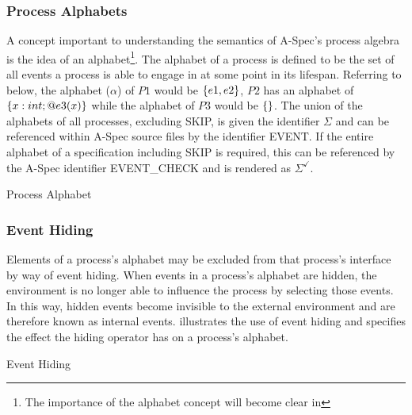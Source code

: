 \documentclass[letterpaper,10pt,draft]{book}
\begin{document}
\subsubsection{Process Alphabets}
   \label{sect:ProcAlpha}

A concept important to understanding the semantics of A-Spec's process algebra is
the idea of an alphabet\footnote{The importance of the alphabet concept will become
clear in }.  The alphabet of a process is defined to be the
set of all events a process is able to engage in at some point in its lifespan.
Referring to  below, the alphabet ($\alpha$) of $P1$ would be
$\{ e1, e2 \}$, $P2$ has an alphabet of $\{ x: int; @ e3(x) \}$ while the alphabet
of $P3$ would be $\{  \}$.  The union of the alphabets of all processes, excluding
SKIP, is given the identifier $\Sigma$ and can be referenced within A-Spec source
files by the identifier EVENT.  If the entire alphabet of a specification including
SKIP is required, this can be referenced by the A-Spec identifier EVENT\_CHECK and
is rendered as $\Sigma^{\checkmark}$.

\begin{example}
\begin{minipage}[t]{0.49\linewidth}
   
\end{minipage}
\begin{minipage}[t]{0.49\linewidth}
   \azbox
   
\end{minipage}

   \caption{Process Alphabet}
   \label{ex:ProcAlph}
\end{example}

\subsubsection{Event Hiding}
   \label{sect:EventHiding}

Elements of a process's alphabet may be excluded from that process's interface by
way of event hiding.  When events in a process's alphabet are hidden, the environment
is no longer able to influence the process by selecting those events.  In this way,
hidden events become invisible to the external environment and are therefore known
as internal events.   illustrates the use of event hiding and
specifies the effect the hiding operator has on a process's alphabet.

\begin{example}
\begin{minipage}[t]{0.49\linewidth}
   
\end{minipage}
\begin{minipage}[t]{0.49\linewidth}
   \azbox
   
\end{minipage}

   \caption{Event Hiding}
   \label{ex:EvtHide}
\end{example}
\end{document}
